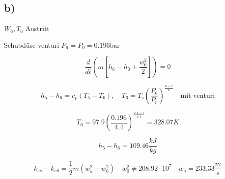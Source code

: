 

\subsection*{b)}
$W_6, T_6$ Austritt

Schubdüse venturi $P_6 = P_0 = 0.196 \text{bar}$

\[
\frac{d}{dt} \left( m \left[ h_6 - h_0 + \frac{w_6^2}{2} \right] \right) = 0
\]

\[
h_5 - h_6 = c_p (T_5 - T_6), \quad T_6 = T_s \left( \frac{P_6}{P_5} \right)^{\frac{\kappa - 1}{\kappa}} \quad \text{mit venturi}
\]

\[
T_6 = 97.9 \left( \frac{0.196}{4.4} \right)^{\frac{2.4 - 1}{2.4}} = 328.07 K
\]

\[
h_5 - h_6 = 109.46 \frac{kJ}{kg}
\]

\[
k_{es} - k_{e6} = \frac{1}{2} m \left( w_5^2 - w_6^2 \right) \quad w_0^2 \neq 208.92 \cdot 10^7 \quad w_5 = 233.33 \frac{m}{s}
\]